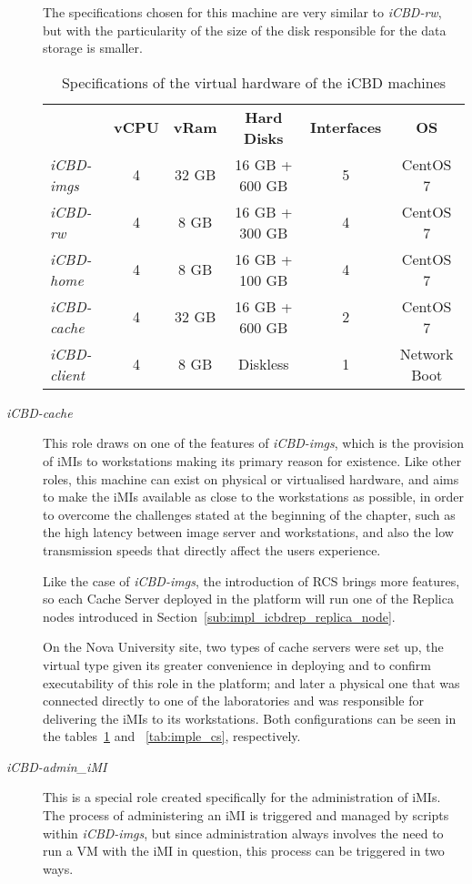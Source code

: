 \begin{description}
	The specifications chosen for this machine are very similar to \textit{iCBD-rw}, but with the particularity of the size of the disk responsible for the data storage is smaller.
	\begin{table}[]
\centering
\begin{tabular}{lccccc}
 & \textbf{vCPU} & \textbf{vRam} & \textbf{Hard Disks} & \textbf{Interfaces} & \textbf{OS} \\ \cline{2-6} 
\textit{iCBD-imgs} & 4 & 32 GB & 16 GB + 600 GB & 5 & CentOS 7 \\
\textit{iCBD-rw} & 4 & 8 GB & 16 GB + 300 GB & 4 & CentOS 7 \\
\textit{iCBD-home} & 4 & 8 GB & 16 GB + 100 GB & 4 & CentOS 7 \\
\textit{iCBD-cache} & 4 & 32 GB & 16 GB + 600 GB & 2 & CentOS 7 \\
\textit{iCBD-client} & 4 & 8 GB & Diskless & 1 & Network Boot
\end{tabular}
\caption{Specifications of the virtual hardware of the iCBD machines}
\label{tab:impl_VM_Specs}
\end{table}

	\item [\textit{iCBD-cache}] This role draws on one of the features of \textit{iCBD-imgs}, which is the provision of iMIs to workstations making its primary reason for existence. Like other roles, this machine can exist on physical or virtualised hardware, and aims to make the iMIs available as close to the workstations as possible, in order to overcome the challenges stated at the beginning of the chapter, such as the high latency between image server and workstations, and also the low transmission speeds that directly affect the users experience. 

	Like the case of \textit{iCBD-imgs}, the introduction of RCS brings more features, so each Cache Server deployed in the platform will run one of the Replica nodes introduced in Section~\ref{sub:impl_icbdrep_replica_node}. 
	
	On the Nova University site, two types of cache servers were set up, the virtual type given its greater convenience in deploying and to confirm executability of this role in the platform; and later a physical one that was connected directly to one of the laboratories and was responsible for delivering the iMIs to its workstations. Both configurations can be seen in the tables~\ref{tab:impl_VM_Specs} and ~\ref{tab:imple_cs}, respectively.
	\item [\textit{iCBD-admin\_iMI}] This is a special role created specifically for the administration of iMIs. The process of administering an iMI is triggered and managed by scripts within \textit{iCBD-imgs}, but since administration always involves the need to run a VM with the iMI in question, this process can be triggered in two ways. 


\end{description}
